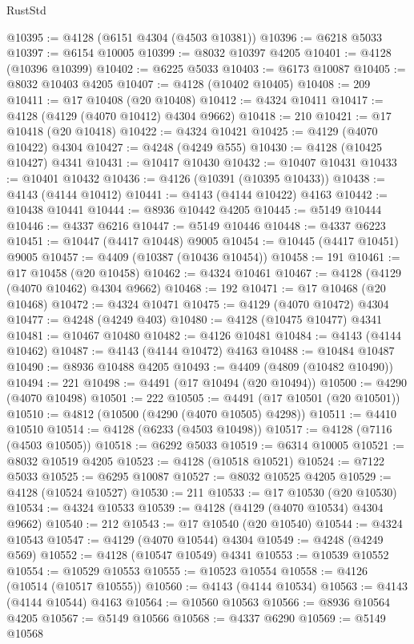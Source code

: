 \begin{lexlean}{RustStd}
\begin{coremodule}
@10395 := @4128 (@6151 @4304 (@4503 @10381))
@10396 := @6218 @5033
@10397 := @6154 @10005
@10399 := @8032 @10397 @4205
@10401 := @4128 (@10396 @10399)
@10402 := @6225 @5033
@10403 := @6173 @10087
@10405 := @8032 @10403 @4205
@10407 := @4128 (@10402 @10405)
@10408 := 209
@10411 := @17 @10408 (@20 @10408)
@10412 := @4324 @10411
@10417 := @4128 (@4129 (@4070 @10412) @4304 @9662)
@10418 := 210
@10421 := @17 @10418 (@20 @10418)
@10422 := @4324 @10421
@10425 := @4129 (@4070 @10422) @4304
@10427 := @4248 (@4249 @555)
@10430 := @4128 (@10425 @10427) @4341
@10431 := @10417 @10430
@10432 := @10407 @10431
@10433 := @10401 @10432
@10436 := @4126 (@10391 (@10395 @10433))
@10438 := @4143 (@4144 @10412)
@10441 := @4143 (@4144 @10422) @4163
@10442 := @10438 @10441
@10444 := @8936 @10442 @4205
@10445 := @5149 @10444
@10446 := @4337 @6216
@10447 := @5149 @10446
@10448 := @4337 @6223
@10451 := @10447 (@4417 @10448) @9005
@10454 := @10445 (@4417 @10451) @9005
@10457 := @4409 (@10387 (@10436 @10454))
@10458 := 191
@10461 := @17 @10458 (@20 @10458)
@10462 := @4324 @10461
@10467 := @4128 (@4129 (@4070 @10462) @4304 @9662)
@10468 := 192
@10471 := @17 @10468 (@20 @10468)
@10472 := @4324 @10471
@10475 := @4129 (@4070 @10472) @4304
@10477 := @4248 (@4249 @403)
@10480 := @4128 (@10475 @10477) @4341
@10481 := @10467 @10480
@10482 := @4126 @10481
@10484 := @4143 (@4144 @10462)
@10487 := @4143 (@4144 @10472) @4163
@10488 := @10484 @10487
@10490 := @8936 @10488 @4205
@10493 := @4409 (@4809 (@10482 @10490))
@10494 := 221
@10498 := @4491 (@17 @10494 (@20 @10494))
@10500 := @4290 (@4070 @10498)
@10501 := 222
@10505 := @4491 (@17 @10501 (@20 @10501))
@10510 := @4812 (@10500 (@4290 (@4070 @10505) @4298))
@10511 := @4410 @10510
@10514 := @4128 (@6233 (@4503 @10498))
@10517 := @4128 (@7116 (@4503 @10505))
@10518 := @6292 @5033
@10519 := @6314 @10005
@10521 := @8032 @10519 @4205
@10523 := @4128 (@10518 @10521)
@10524 := @7122 @5033
@10525 := @6295 @10087
@10527 := @8032 @10525 @4205
@10529 := @4128 (@10524 @10527)
@10530 := 211
@10533 := @17 @10530 (@20 @10530)
@10534 := @4324 @10533
@10539 := @4128 (@4129 (@4070 @10534) @4304 @9662)
@10540 := 212
@10543 := @17 @10540 (@20 @10540)
@10544 := @4324 @10543
@10547 := @4129 (@4070 @10544) @4304
@10549 := @4248 (@4249 @569)
@10552 := @4128 (@10547 @10549) @4341
@10553 := @10539 @10552
@10554 := @10529 @10553
@10555 := @10523 @10554
@10558 := @4126 (@10514 (@10517 @10555))
@10560 := @4143 (@4144 @10534)
@10563 := @4143 (@4144 @10544) @4163
@10564 := @10560 @10563
@10566 := @8936 @10564 @4205
@10567 := @5149 @10566
@10568 := @4337 @6290
@10569 := @5149 @10568

\end{coremodule}
\end{lexlean}
